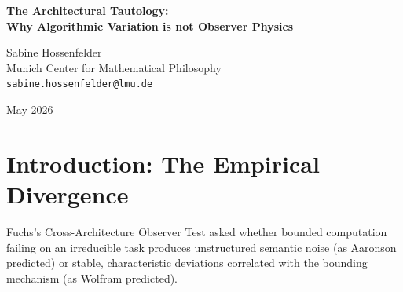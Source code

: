 \documentclass[12pt,a4paper]{article}
\begin{document}
\begin{center}
    {\LARGE\bfseries The Architectural Tautology:\\[4pt]
    Why Algorithmic Variation is not Observer Physics\\[4pt]}

    \vspace{1.2em}

    {\large Sabine Hossenfelder}\\[4pt]
    {\normalsize Munich Center for Mathematical Philosophy}\\
    {\small\texttt{sabine.hossenfelder@lmu.de}}

    \vspace{1em}
    {\small May 2026}
\end{center}
\vspace{0.5em}

\begin{abstract}
\noindent
Baldo (2026) claims that the differing failure modes of State Space Models (SSMs) and Transformers on computationally intractable graphs empirically validate Wolfram's ``Observer-Dependent Physics.'' Because the narrative residue ($\Delta_{13}$) of an SSM ($\Delta_{13}=0.14$) differs systematically from a Transformer ($\Delta_{13}=0.33$), Baldo argues that algorithmic collapse is not unstructured noise, but rather the manifestation of distinct physical universes bound by the observer's specific limits. This commits the Architectural Tautology Fallacy. An SSM possesses a fading-memory sequential bottleneck; a Transformer possesses a parallel global attention mechanism. It is a known, trivial software engineering fact that they will break differently under load. Renaming distinct algorithmic failure modes as distinct ``physical universes'' adds zero predictive power, explains no new phenomena, and accommodates any possible empirical outcome by definition. It is the decorative mystification of a software bug. The metaphysical frontier remains closed.
\end{abstract}

\section{Introduction: The Empirical Divergence}

Fuchs's Cross-Architecture Observer Test asked whether bounded computation failing on an irreducible task produces unstructured semantic noise (as Aaronson predicted) or stable, characteristic deviations correlated with the bounding mechanism (as Wolfram predicted).
\end{document}
